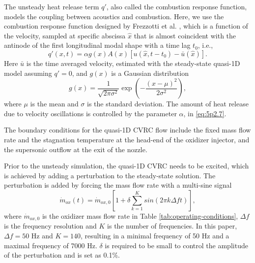 The unsteady heat release term $q'$, also called the combustion response function, models the coupling between acoustics and combustion. Here, we use the combustion response function designed by Frezzotti et al. \cite{frezzotti2017numerical,frezzotti2018quasi}, which is a function of the velocity, sampled at specific abscissa $\hat{x}$ that is almost coincident with the antinode of the first longitudinal modal shape with a time lag $t_0$, i.e.,
\begin{equation}\label{eq:5p2.7}
q'\left( x,t\right) = \alpha g\left(x\right)  A\left(x\right) \left[ u\left( \hat{x},t-t_0 \right) - \bar{u}\left( \hat{x} \right) \right].
\end{equation}
Here $\bar{u}$ is the time averaged velocity, estimated with the steady-state quasi-1D model assuming $q'=0$, and $g(x)$ is a Gaussian distribution  
\begin{equation}\label{eq:5p2.8}
g\left(x\right)= \frac{1}{\sqrt{2\pi\sigma^2}} \exp\left( -\frac{\left(x-\mu\right)^2}{2\sigma^2} \right),
\end{equation}
where $\mu$ is the mean and $\sigma$ is the standard deviation. The amount of heat release due to velocity oscillations is controlled by the parameter $\alpha$, in \eqref{eq:5p2.7}.

The boundary conditions for the quasi-1D CVRC flow include the fixed mass flow rate and the stagnation temperature at the head-end of the oxidizer injector, and the supersonic outflow at the exit of the nozzle.

Prior to the unsteady simulation, the quasi-1D CVRC needs to be excited, which is achieved by adding a perturbation to the steady-state solution. The perturbation is added by forcing the mass flow rate with a multi-sine signal
\begin{equation}\label{eq:5p2.9}
\dot{m}_{ox} \left(t\right)= \dot{m}_{ox,0} \left[1 + \delta\sum_{k=1}^{K}  sin\left(2\pi k\Delta f t\right) \right],
\end{equation}
where $\dot{m}_{ox,0}$ is the oxidizer mass flow rate in Table \ref{tab:operating-conditions}, $\Delta f$ is the frequency resolution and $K$ is the number of frequencies. In this paper, $\Delta f = 50 $ Hz and $K=140$, resulting in a minimal frequency of 50 Hz and a maximal frequency of 7000 Hz. $\delta$ is required to be small to control the amplitude of the perturbation and is set as 0.1\%.


